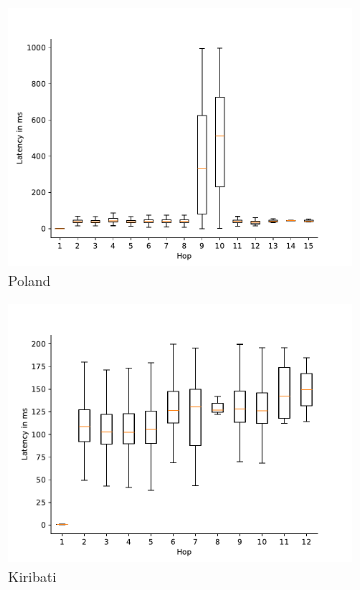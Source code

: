 \begin{figure}
	\centering
	\begin{subfigure}[b]{0.48\linewidth}
		\includegraphics[width=\linewidth]{chapters/4-results/traceroute/img/latency-per-hop-PL.pdf}
		\caption{Poland}
	\end{subfigure}
	\begin{subfigure}[b]{0.48\linewidth}
		\includegraphics[width=\linewidth]{chapters/4-results/traceroute/img/latency-per-hop-KI.pdf}
		\caption{Kiribati}
	\end{subfigure}
	\begin{subfigure}[b]{0.48\linewidth}

\end{subfigure}
\end{figure}
